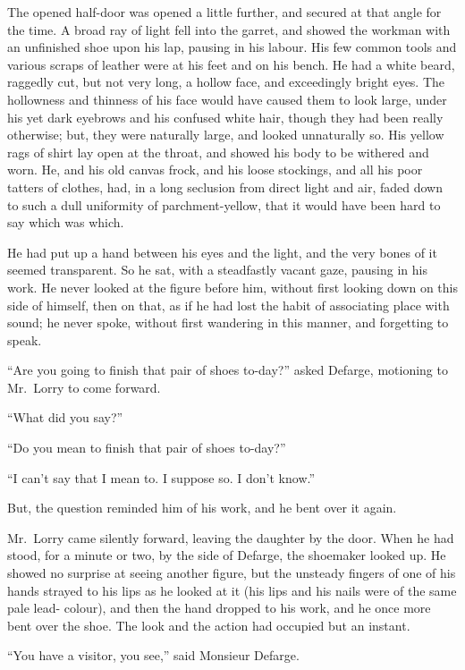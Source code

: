 The opened half-door was opened a little further, and secured at that
angle for the time.  A broad ray of light fell into the garret, and
showed the workman with an unfinished shoe upon his lap, pausing in
his labour.  His few common tools and various scraps of leather were
at his feet and on his bench.  He had a white beard, raggedly cut,
but not very long, a hollow face, and exceedingly bright eyes.  The
hollowness and thinness of his face would have caused them to look
large, under his yet dark eyebrows and his confused white hair,
though they had been really otherwise; but, they were naturally
large, and looked unnaturally so.  His yellow rags of shirt lay open
at the throat, and showed his body to be withered and worn.  He, and
his old canvas frock, and his loose stockings, and all his poor
tatters of clothes, had, in a long seclusion from direct light and
air, faded down to such a dull uniformity of parchment-yellow, that
it would have been hard to say which was which.

He had put up a hand between his eyes and the light, and the very
bones of it seemed transparent.  So he sat, with a steadfastly vacant
gaze, pausing in his work.  He never looked at the figure before him,
without first looking down on this side of himself, then on that, as
if he had lost the habit of associating place with sound; he never
spoke, without first wandering in this manner, and forgetting to speak.

``Are you going to finish that pair of shoes to-day?'' asked Defarge,
motioning to Mr.\ Lorry to come forward.

``What did you say?''

``Do you mean to finish that pair of shoes to-day?''

``I can't say that I mean to.  I suppose so.  I don't know.''

But, the question reminded him of his work, and he bent over it again.

Mr.\ Lorry came silently forward, leaving the daughter by the door.
When he had stood, for a minute or two, by the side of Defarge, the
shoemaker looked up.  He showed no surprise at seeing another figure,
but the unsteady fingers of one of his hands strayed to his lips as
he looked at it (his lips and his nails were of the same pale lead-%
colour), and then the hand dropped to his work, and he once more bent
over the shoe.  The look and the action had occupied but an instant.

``You have a visitor, you see,'' said Monsieur Defarge.

